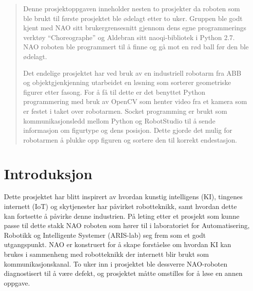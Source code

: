 \documentclass[conference]{IEEEtran}
\begin{document}




\maketitle

\begin{abstract}
    Denne prosjektoppgaven inneholder nesten to prosjekter da roboten som ble brukt til første prosjektet ble ødelagt etter to uker. 
    Gruppen ble godt kjent med NAO sitt brukergrensesnitt gjennom dens egne programmerings verktøy “Choreographe” og Aldebran sitt 
    naoqi-bibliotek i Python 2.7. NAO roboten ble programmert til å finne og gå mot en rød ball før den ble ødelagt. 

    Det endelige prosjektet har ved bruk av en industriell robotarm fra ABB og objektgjenkjenning utarbeidet en løsning som sorterer 
    geometriske figurer etter fasong. For å få til dette er det benyttet Python programmering med bruk av OpenCV som henter video fra 
    et kamera som er festet i taket over robotarmen. Socket programming er brukt som kommunikasjonsledd mellom Python og RobotStudio til 
    å sende informasjon om figurtype og dens posisjon. Dette gjorde det mulig for robotarmen å plukke opp figuren og sortere den til 
    korrekt endestasjon. 
\end{abstract}





%
\IEEEpeerreviewmaketitle



\section{Introduksjon}
Dette prosjektet har blitt inspirert av hvordan kunstig intelligens (KI), tingenes internett (IoT) og skytjenester har påvirket robotteknikk, 
samt hvordan dette kan fortsette å påvirke denne industrien. På leting etter et prosjekt som kunne passe til dette stakk NAO roboten som hører
til i laboratoriet for Automatisering, Robotikk og Intelligente Systemer (ARIS-lab) seg frem som et godt utgangspunkt. NAO er konstruert for å 
skape forståelse om hvordan KI kan brukes i sammenheng med robotteknikk der internett blir brukt som kommunikasjonskanal. To uker inn i prosjektet 
ble dessverre NAO-roboten diagnostisert til å være defekt, og prosjektet måtte omstilles for å løse en annen oppgave.  
\end{document}
